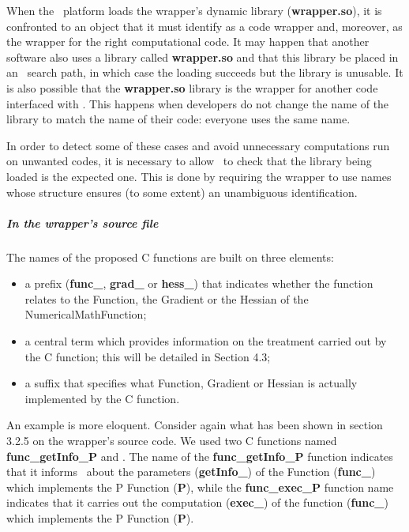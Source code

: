 When the \OT\ platform loads the wrapper's dynamic library ({\bf wrapper.so}), it is confronted to an object that it must identify as a code wrapper and, moreover, as the wrapper for the right computational code. It may happen that another software also uses a library called {\bf wrapper.so} and that this library be placed in an \OT\ search path, in which case the loading succeeds but the library is unusable. It is also possible that the {\bf wrapper.so} library is the wrapper for another code interfaced with \OT . This happens when developers do not change the name of the library to match the name of their code: everyone uses the same name.

In order to detect some of these cases and avoid unnecessary computations run on unwanted codes, it is necessary to allow \OT\ to check that the library being loaded is the expected one. This is done by requiring the wrapper to use names whose structure ensures (to some extent) an unambiguous identification.

\subparagraph{In the wrapper's source file}

The names of the proposed C functions are built on three elements:
\begin{itemize}
\item a prefix ({\bf func\_}, {\bf grad\_} or {\bf hess\_}) that indicates whether the function relates to the Function, the Gradient or the Hessian of the NumericalMathFunction;
\item a central term which provides information on the treatment carried out by the C function; this will be detailed in Section 4.3;
\item a suffix that specifies what Function, Gradient or Hessian is actually implemented by the C function.
\end{itemize}

An example is more eloquent. Consider again what has been shown in section 3.2.5 on the wrapper's source code. We used two C functions named {\bf func\_getInfo\_P} and . The name of the {\bf func\_getInfo\_P} function indicates that it informs \OT\ about the parameters ({\bf getInfo\_}) of the Function ({\bf func\_}) which implements the P Function ({\bf P}), while the {\bf func\_exec\_P} function name indicates that it carries out the computation ({\bf exec\_}) of the function ({\bf func\_}) which implements the P Function ({\bf P}).

